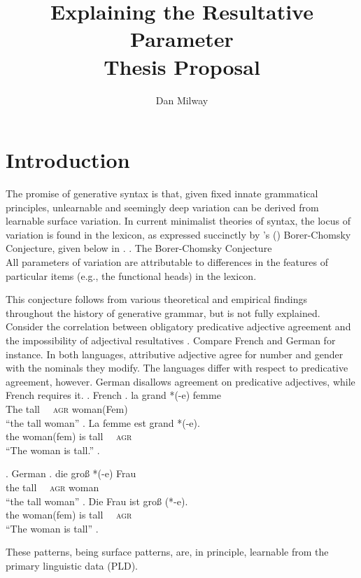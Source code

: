 \documentclass[letterpaper,12pt]{article}
\title{Explaining the Resultative Parameter\\{\large Thesis Proposal}}
\author{Dan Milway}
\begin{document}
\maketitle

\section{Introduction}
The promise of generative syntax is that, given fixed innate grammatical principles, unlearnable and seemingly deep variation can be derived from learnable surface variation.
In current minimalist theories of syntax, the locus of variation is found in the lexicon, as expressed succinctly by \citeauthor{baker2008microparameter}'s (\citeyear{baker2008microparameter}) Borer-Chomsky Conjecture, given below in \Next.
\ex. The Borer-Chomsky Conjecture\\
All parameters of variation are attributable to differences in the features of particular items (e.g., the functional heads) in the lexicon. \hfill \parencite{baker2008microparameter}

This conjecture follows from various theoretical and empirical findings throughout the history of generative grammar, but is not fully explained.
Consider the correlation between obligatory predicative adjective agreement and the impossibility of adjectival resultatives \parencite{kratzer_building_2004}.
Compare French and German for instance.
In both languages, attributive adjective agree for number and gender with the nominals they modify. 
The languages differ with respect to predicative agreement, however.
German disallows agreement on predicative adjectives, while French requires it.
\ex. French 
\ag. la grand *(-e) femme\\
The tall \textsc{~~agr} woman(Fem)\\
``the tall woman''
\bg. La femme est grand *(-e).\\
the woman(fem) is tall \textsc{~~agr}\\
``The woman is tall.''
\z.

\ex. German 
\ag. die gro\ss{} *(-e) Frau\\
the tall \textsc{~~agr} woman\\
``the tall woman''
\bg. Die Frau ist gro\ss{} (*-e).\\
the woman(fem) is tall \textsc{~~agr}\\
``The woman is tall''
\z.

These patterns, being surface patterns, are, in principle, learnable from the primary linguistic data (PLD).
\end{document}

